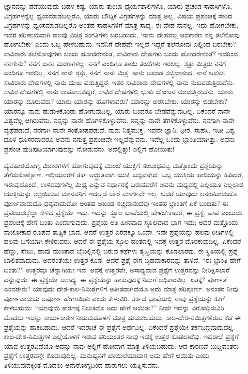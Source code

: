 ಜ್ಞಾನವನ್ನು ಪಡೆಯುವುದು ಬಹಳ ಕಷ್ಟ. ಯಾರು ತುಂಬಾ ಧೈರ್ಯಶಾಲಿಗಳೊ, ಯಾರು ಪ್ರಚಂಡ ಸಾಹಸಿಗಳೊ, ವಿಗ್ರಹಗಳನ್ನೆಲ್ಲ ಧ್ವಂಸಮಾಡಬಲ್ಲರೊ, ಯಾರು ಬೌದ್ದಿಕ ವಿಗ್ರಹಗಳನ್ನು ಮಾತ್ರ ಅಲ್ಲ, ವಿಷಯ ಪ್ರಪಂಚಕ್ಕೆ ಸೇರಿದ ವಿಗ್ರಹಗಳನ್ನು ಧ್ವಂಸಮಾಡಬಲ್ಲರೊ ಅಂತಹ ಸಾಹಸಿಗಳಿಗೆ ಮಾತ್ರ ಸಾಧ್ಯ. ಈ ದೇಹ ನಾನಲ್ಲ, ಇದು ಹೋಗಬೇಕು. ಇದರ ಪರಿಣಾಮವಾಗಿ ಹಲವು ವಿಚಿತ್ರ ಸಂಗತಿಗಳು ಬರಬಹುದು. `ನಾನು ದೇಹವಲ್ಲ ಆದಕಾರಣ ನನ್ನ ತಲೆನೋವು ಹೋಗಬೇಕು' ಎಂದು ಒಬ್ಬ ಹೇಳಬಹುದು. ಇವನಿಗೆ ದೇಹವೇ ಇಲ್ಲದೆ ಇದ್ದರೆ ತಲೆನೋವು ಎಲ್ಲಿಂದ ಬರಬೇಕು? ಸಾವಿರಾರು ತಲೆನೋವುಗಳು ಬಂದು ಹೋದರೇನಂತೆ, ಸಾವಿರಾರು ದೇಹಗಳು ಬಂದು ಹೋದರೇನಂತೆ? ಇದರಿಂದ ನನಗೇನು? ನನಗೆ ಜನನ ಮರಣಗಳಿಲ್ಲ. ನನಗೆ ಎಂದಿಗೂ ತಾಯಿ ತಂದೆಗಳು ಇರಲಿಲ್ಲ. ಶತ್ರು ಮಿತ್ರರು ನನಗೆ ಎಂದಿಗೂ ಇರಲಿಲ್ಲ. ನನಗೆ ನಾನೇ ಶತ್ರು, ನನಗೆ ನಾನೇ ಮಿತ್ರ. ನಾನು ಅಖಂಡ ಸಚ್ಚಿದಾನಂದ. ನಾನೆ ಅವನು. ಸಾವಿರಾರು ದೇಹಗಳಲ್ಲಿ ನಾನು ದುಃಖ ಪಡುತ್ತಿದ್ದರೆ, ಇತರ ಸಾವಿರಾರು ದೇಹಗಳಲ್ಲಿ ನಾನು ಸುಖಪಡುತ್ತಿರುವೆನು. ಸಾವಿರ ದೇಹಗಳಲ್ಲಿ ನಾನು ಉಪವಾಸವಿದ್ದರೆ, ಸಾವಿರ ದೇಹಗಳಲ್ಲಿ ಭೂರಿ ಭೋಜನ ಮಾಡುತ್ತಿರುವೆನು. ಯಾರು ಯಾರನ್ನು ದೂರುವರು? ಯಾರು ಯಾರನ್ನು ಹೊಗಳುವರು? ಯಾರನ್ನು ಅರಸಬೇಕು, ಯಾರನ್ನು ಬಿಡಬೇಕು? ಯಾರನ್ನೂ ನಾನು ಹುಡುಕಿಕೊಂಡು ಹೋಗುವುದಿಲ್ಲ, ಯಾರು ಬಂದರೂ ಬೇಡವೆನ್ನುವುದಿಲ್ಲ. ಏಕೆಂದರೆ ನಾನೇ ವಿಶ್ವವೆಲ್ಲ ಆಗಿರುವೆನು. ನನ್ನನ್ನು ನಾನೇ ಹೊಗಳಿಕೊಳ್ಳುವೆನು, ನನ್ನನ್ನು ನಾನೇ ತೆಗಳಿಕೊಳ್ಳುವೆನು. ನನಗಾಗಿ ನಾನೇ ವ್ಯಥೆಪಡುವೆ, ನನಗಾಗಿ ನಾನೇ ಸಂತೋಷಪಡುವೆ. ನಾನು ನಿತ್ಯಮುಕ್ತ. ಇವನೇ ಜ್ಞಾನಿ, ಧೀರ, ಸಾಹಸಿ. ಇಡೀ ವಿಶ್ವ ಧೂಳಿ ಧೂಸರವಾದರೂ ಅವನು ನಗುತ್ತ ಪ್ರಪಂಚವೇ ಇಲ್ಲವೆನ್ನುವನು. ಇದೆಲ್ಲ ಒಂದು ಭ್ರಾಂತಿಯಾಗಿತ್ತು. ಅವನು ಪ್ರಪಂಚ ಪುಡಿಪುಡಿಯಾಗುವುದನ್ನು ನೋಡುವನು. ಅದೆಲ್ಲಿತ್ತು! ಎಲ್ಲಿಗೆ ಹೋಯಿತು!

ವ್ಯವಹಾರಯೋಗ್ಯ ವಿಚಾರಗಳಿಗೆ ಹೋಗುವುದಕ್ಕೆ ಮುಂಚೆ ಯುಕ್ತಿಗೆ ಸಂಬಂಧಪಟ್ಟ ಮತ್ತೊಂದು ಪ್ರಶ್ನೆಯನ್ನು ತೆಗೆದುಕೊಳ್ಳೋಣ. ಇಲ್ಲಿಯವರೆಗೆ ತರ್ಕ ಅದ್ಭುತವಾಗಿ ಯುಕ್ತಿ ಬದ್ದವಾಗಿದೆ. ಒಬ್ಬ ಯುಕ್ತಿಯ ಹಾದಿಯನ್ನು ಹಿಡಿದರೆ, ಇರುವುದೊಂದೆ, ಉಳಿದವುಗಳೆಲ್ಲ ಮಿಥ್ಯ ಎನ್ನುವ ನಿರ್ಧಾರಕ್ಕೆ ಬರುವವರೆಗೆ ಅವನು ಮಧ್ಯದಲ್ಲಿ ಎಲ್ಲಿಯೂ ನಿಲ್ಲಲಾರ. ಯುಕ್ತಿಯನ್ನು ಆಶ್ರಯಿಸುವ ಮಾನವನಿಗೆ ಇದಲ್ಲದೆ ಬೇರೆ ಮಾರ್ಗವೇ ಇಲ್ಲ. ಆದರೆ ಯಾವುದು ಅನಂತವಾದುದೊ ಪೂರ್ಣವಾದುದೊ ಧನ್ಯವಾದುದೋ ಅಂತಹ ಅಖಂಡ ಸಚ್ಚಿದಾನಂದವು ಇಂತಹ ಭ್ರಾಂತಿಗೆ ಏಕೆ ಬಂದಿತು? ಈ ಪ್ರಪಂಚದಲ್ಲೆಲ್ಲಾ ಕೇಳಿದ ಪ್ರಶ್ನೆಯೇ ಇದು. ಇದನ್ನು ಸ್ಥೂಲ ಭಾಷೆಯಲ್ಲಿ ಹೇಳಬೇಕಾದರೆ, ಈ ಪ್ರಶ್ನೆ, ಪಾಪ ಎಂಬುದು ಪ್ರಪಂಚಕ್ಕೆ ಹೇಗೆ ಬಂತು ಎಂದಾಗುವುದು. ಪ್ರಶ್ನೆಯ ಅತಿ ಹೀನವಾದ ಸ್ಥೂಲವಾದ ಭಾಗ ಇದು; ಅದರ ಮತ್ತೊಂದು ನಾಜೋಕಾದ ರೂಪವೆ ತಾತ್ವಿಕ ಭಾವ. ಆದರೆ ಉತ್ತರ ಎರಡಕ್ಕೂ ಒಂದೇ. ಇದೇ ಪ್ರಶ್ನೆಯನ್ನು ಹಲವು ರೀತಿಗಳಲ್ಲಿ ಹಲವು ಬಗೆಯಾಗಿ ಕೇಳಿರುವರು. ಆದರೆ ಈ ಪ್ರಶ್ನೆಯ ಸ್ಥೂಲ ಹಂತದಲ್ಲಿ ಇದಕ್ಕೆ ಉತ್ತರ ದೊರಕುವುದಿಲ್ಲ. ಏಕೆಂದರೆ ಹೆಣ್ಣು, ಸೇಬು, ಹಾವು ಮುಂತಾದ ಬೈಬಲ್ಲಿನಲ್ಲಿ ಬರುವ ಕಥೆಗಳು ತೃಪ್ತಿಯನ್ನು ಕೊಡಲಾರವು. ಈ ಸ್ಥಿತಿಯಲ್ಲಿ ಪ್ರಶ್ನೆ ಬಾಲಿಶವಾದುದು, ಅದರಂತೆಯೇ ಉತ್ತರ ಕೂಡ. ಆದರೆ ಪ್ರಶ್ನೆ ಈಗ ಬೃಹದಾಕಾರವನ್ನು ತಾಳಿದೆ. “ಈ ಭ್ರಾಂತಿ ಹೇಗೆ ಬಂತು?'' ಉತ್ತರವೂ ಚೆನ್ನಾಗಿಯೇ ಇದೆ. ಅದಕ್ಕೆ ಉತ್ತರವೇ, ಅಸಾಧ್ಯವಾದ ಪ್ರಶ್ನೆಗೆ ಉತ್ತರವನ್ನು ನೀರಿಕ್ಷಿಸಲಾರೆ ಎನ್ನುವುದು. ಈ ಪ್ರಶ್ನೆಯೇ ಅಸಾಧ್ಯ. ಈ ಪ್ರಶ್ನೆಯನ್ನು ಹಾಕುವುದಕ್ಕೆ ನಿಮಗೆ ಅಧಿಕಾರವಿಲ್ಲ. ಏತಕ್ಕೆ? ಪೂರ್ಣತೆ ಎಂದರೇನು? ಯಾವುದು ದೇಶ-ಕಾಲ-ನಿಮಿತ್ತಗಳಿಗೆ ಅತೀತವಾಗಿದೆಯೊ ಅದು ಮಾತ್ರ ಪರಿಪೂರ್ಣ. ಅನಂತರ ನೀವು ಪೂರ್ಣವಾದುದು ಅಪೂರ್ಣ ಹೇಗಾಯಿತು ಎಂದು ಕೇಳುವಿರಿ. ತರ್ಕದ ಭಾಷೆಯಲ್ಲಿ ನಾವು ಪ್ರಶ್ನೆಯನ್ನು ಹೀಗೆ ಕೇಳಬಹುದು: “ಯಾವುದು ಕಾರಣಕ್ಕೆ ನಿಲುಕದೊ ಅದು ಹೇಗೆ ಆಯಿತು?'' ನೀವೇ ಇದನ್ನು ವಿರೋಧಿಸುವಿರಿ. ಮೊದಲು ಇದನ್ನು ಕಾರ್ಯಕಾರಣ ನಿಯಮದೊಳಗೆ ಮಾತ್ರ ಹುಡುಕಬಹುದು, ಕಾಲ-ದೇಶ-ನಿಮಿತ್ತಗಳಿರುವ ಕಡೆ ಈ ಪ್ರಶ್ನೆಯನ್ನು ಹಾಕಬಹುದು. ಆದರೆ ಇದರಾಚೆ ಈ ಪ್ರಶ್ನೆಗೆ ಅರ್ಥವಿಲ್ಲ. ಏಕೆಂದರೆ ಪ್ರಶ್ನೆಯೇ ತರ್ಕಬದ್ಧವಾದುದಲ್ಲ. ಕಾಲ-ದೇಶ-ನಿಮಿತ್ತಗಳ ಎಲ್ಲೆಯೊಳಗೆ ಇರುವ ಪರಿಯಂತರ ನಾವು ಇದಕ್ಕೆ ಉತ್ತರ ಕೊಡಲಾರೆವು. ಇದರಾಚೆ ಪ್ರಶ್ನೆಗೆ ಯಾವ ಉತ್ತರವಿದೆಯೊ ಅದನ್ನು ನಾವು ಅಲ್ಲಿಗೆ ಹೋದಾಗ ಮಾತ್ರ ತಿಳಿಯಬಹುದು. ಆದ ಕಾರಣವೆ ಬುದ್ದಿವಂತರು ಪ್ರಶ್ನೆಗೆ ಉತ್ತರವನ್ನೇ ಕೊಡುವುದಿಲ್ಲ. ಮನುಷ್ಯನಿಗೆ ಖಾಯಿಲೆಯಾದಾಗ ಅದು ಹೇಗೆ ಆಯಿತು ಎಂದು ತಿಳಿಯುವುದಕ್ಕಿಂತ ಮೊದಲು ಅನಾರೋಗ್ಯದಿಂದ ಪಾರಾಗಲು ಯತ್ನಿಸುವನು.

